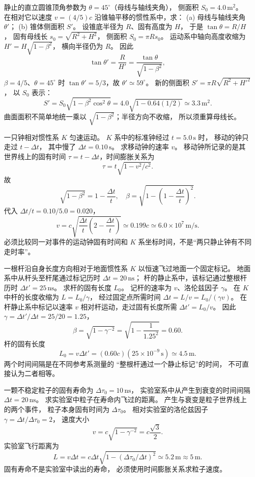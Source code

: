 静止的直立圆锥顶角参数为
$\theta=45^\circ$（母线与轴线夹角），
侧面积 $S_0=4.0\,\mathrm{m^2}$。
在相对它以速度 $v=(4/5)c$
沿锥轴平移的惯性系中，求：
(a) 母线与轴线夹角 $\theta'$；
(b) 锥体侧面积 $S'$。
\exsolution
设锥底半径为 $R$、固有高度为 $H$，
于是 $\tan\theta=R/H$，
固有母线长 $s_0=\sqrt{R^2+H^2}$，
侧面积 $S_0=\pi R s_0$。
运动系中轴向高度收缩为
$H'=H\sqrt{1-\beta^2}$，
横向半径仍为 $R$。
因此
\[
\tan\theta'=\frac R{H'}
=\frac{\tan\theta}{\sqrt{1-\beta^2}},
\]
$\beta=4/5$、$\theta=45^\circ$ 时
$\tan\theta'=5/3$，故
$\boxed{\theta'\simeq59^\circ}$。
新的侧面积
$S'=\pi R\sqrt{R^2+H'^2}$，
以 $S_0$ 表示：
\[
\boxed{S'=S_0
\sqrt{1-\beta^2\cos^2\theta}
=4.0\sqrt{1-0.64(1/2)}
\simeq3.3\,\mathrm{m^2}}.
\]
\excheck 曲面面积不简单地统一乘以
$\sqrt{1-\beta^2}$；半径方向不收缩，
所以须重算母线长。

一只钟相对惯性系 $K$ 匀速运动。
$K$ 系中的标准钟经过
$t=5.0\,\mathrm s$ 时，
移动的钟只走过 $t-\Delta t$，
其中慢了 $\Delta t=0.10\,\mathrm s$。
求移动钟的速率 $v$。
\exsolution
移动钟所记录的是其世界线上的固有时间
$\tau=t-\Delta t$，时间膨胀关系为
\[
\tau=t\sqrt{1-v^2/c^2}.
\]
故
\[
\sqrt{1-\beta^2}=1-\frac{\Delta t}{t},
\quad
\beta=\sqrt{1-\left(1-\frac{\Delta t}{t}\right)^2}.
\]
代入 $\Delta t/t=0.10/5.0=0.020$，
\[
\boxed{v=c\sqrt{\frac{\Delta t}{t}
\left(2-\frac{\Delta t}{t}\right)}
\simeq0.199c
\simeq6.0\times10^7\,\mathrm{m/s}}.
\]
\excheck 必须比较同一对事件的运动钟固有时间和
$K$ 系坐标时间，不是“两只静止钟有不同走时率”。

一根杆沿自身长度方向相对于地面惯性系 $K$
以恒速飞过地面一个固定标记。
地面系中从杆头至杆尾通过标记历时
$\Delta t=20\,\mathrm{ns}$；
杆的静止系中，该标记通过整根杆历时
$\Delta t'=25\,\mathrm{ns}$。
求杆的固有长度 $L_0$。
\exsolution
记杆的速率为 $v$、洛伦兹因子 $\gamma$。
在 $K$ 中杆的长度收缩为 $L=L_0/\gamma$，
经过固定点所需时间
$\Delta t=L/v=L_0/(\gamma v)$。
在杆静止系中标记以速率 $v$
相对杆运动，走过固有长度所需
$\Delta t'=L_0/v$。
因此 $\gamma=\Delta t'/\Delta t=25/20=1.25$，
\[
\beta=\sqrt{1-\gamma^{-2}}
=\sqrt{1-\frac1{1.25^2}}=0.60.
\]
杆的固有长度
\[
\boxed{L_0=v\Delta t'
=(0.60c)(25\times10^{-9}\,\mathrm s)
\simeq4.5\,\mathrm m}.
\]
\excheck 两个时间间隔是在不同参考系测量的
“整根杆通过一个静止标记”的时间，
不可直接认为二者相等。

一颗不稳定粒子的固有寿命为
$\Delta\tau_0=10\,\mathrm{ns}$，
实验室系中从产生到衰变的时间间隔
$\Delta t=20\,\mathrm{ns}$。
求实验室中粒子在寿命内飞过的距离。
\exsolution
产生与衰变是粒子世界线上的两个事件，
粒子本身固有时间为 $\Delta\tau_0$。
相对实验室的洛伦兹因子
$\gamma=\Delta t/\Delta\tau_0=2$，
速度大小
\[
v=c\sqrt{1-\gamma^{-2}}
=c\frac{\sqrt3}{2}.
\]
实验室飞行距离为
\[
\boxed{L=v\Delta t
=c\Delta t\sqrt{
1-(\Delta\tau_0/\Delta t)^2}
\simeq5.2\,\mathrm m\approx5\,\mathrm m}.
\]
\excheck 固有寿命不是实验室中读出的寿命，
必须使用时间膨胀关系求粒子速度。

